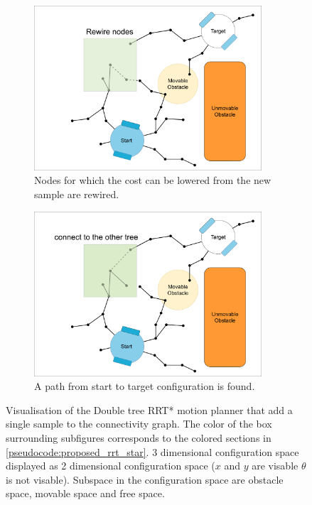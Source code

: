 \begin{figure}[H]
    \begin{subfigure}{.49\textwidth}
    \centering
    \includegraphics[width=0.93\textwidth, cfbox=my_green 5pt 0pt]{figures/mp/5mp_rewire.drawio.png}
    \caption{Nodes for which the cost can be lowered from the new sample are rewired.}
    \end{subfigure}
    \begin{subfigure}{.49\textwidth}
    \centering
    \includegraphics[width=0.93\textwidth, cfbox=my_green 5pt 0pt]{figures/mp/6mp_search_other_tree.drawio.png}
    \caption{A path from start to target configuration is found. \bs}
    \end{subfigure}

    \caption{Visualisation of the Double tree \acs{RRT*} motion planner that add a single sample to the connectivity graph. The color of the box surrounding subfigures corresponds to the colored sections in \cref{pseudocode:proposed_rrt_star}. 3 dimensional configuration space displayed as 2 dimensional configuration space ($x$ and $y$ are visable $\theta$ is not visable). Subspace in the configuration space are obstacle space, movable space and free space. }
    \label{fig:motion_planner_adding_one_sample}
\end{figure}


